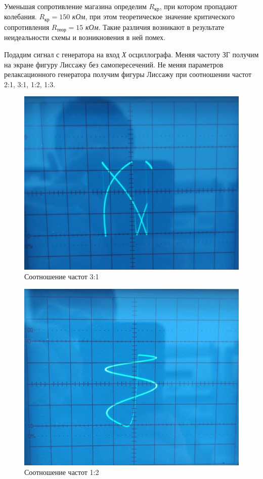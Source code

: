 \documentclass[11pt]{article}
\begin{document}
Уменьшая сопротивление магазина определим $R_{\textit{кр}}$, при котором пропадают колебания. $R_{\textit{кр}} = 150$ \textit{кОм}, при этом теоретическое значение критического сопротивления $R_\textit{теор} = 15$ \textit{кОм}. Такие различия возникают в результате неидеальности схемы и возникновения в ней помех.

\vspace{0.5cm}

Подадим сигнал с генератора на вход \textit{Х} осциллографа. Меняя частоту ЗГ получим на экране фигуру Лиссажу без самопересечений. Не меняя параметров релаксационного генератора получим фигуры Лиссажу при соотношении частот 2:1, 3:1, 1:2, 1:3.

\begin{figure}[h!]
\centering
\includegraphics[scale=0.15]{31.jpg}
\caption{Соотношение частот 3:1}
\label{fig:Image1}
\end{figure}

\begin{figure}[h!]
\centering
\includegraphics[scale=0.15]{12.jpg}
\caption{Соотношение частот 1:2}
\label{fig:Image1}
\end{figure}
\end{document}
